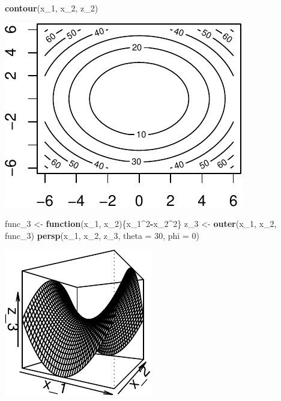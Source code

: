 \documentclass[11pt,]{article}
\newenvironment{Shaded}{\begin{snugshade}}{\end{snugshade}}
\newcommand{\KeywordTok}[1]{\textcolor[rgb]{0.13,0.29,0.53}{\textbf{#1}}}
\newcommand{\DataTypeTok}[1]{\textcolor[rgb]{0.13,0.29,0.53}{#1}}
\newcommand{\DecValTok}[1]{\textcolor[rgb]{0.00,0.00,0.81}{#1}}
\newcommand{\StringTok}[1]{\textcolor[rgb]{0.31,0.60,0.02}{#1}}
\newcommand{\ControlFlowTok}[1]{\textcolor[rgb]{0.13,0.29,0.53}{\textbf{#1}}}
\newcommand{\OperatorTok}[1]{\textcolor[rgb]{0.81,0.36,0.00}{\textbf{#1}}}
\newcommand{\NormalTok}[1]{#1}
\begin{document}
\begin{Shaded}
\begin{Highlighting}[]
\KeywordTok{contour}\NormalTok{(x_}\DecValTok{1}\NormalTok{, x_}\DecValTok{2}\NormalTok{, z_}\DecValTok{2}\NormalTok{)}
\end{Highlighting}
\end{Shaded}

\begin{center}\includegraphics{Optimization_2_files/figure-latex/level_sets-4} \end{center}

\begin{Shaded}
\begin{Highlighting}[]
\NormalTok{func_}\DecValTok{3}\NormalTok{ <-}\StringTok{ }\ControlFlowTok{function}\NormalTok{(x_}\DecValTok{1}\NormalTok{, x_}\DecValTok{2}\NormalTok{)\{x_}\DecValTok{1}\OperatorTok{^}\DecValTok{2}\OperatorTok{-}\NormalTok{x_}\DecValTok{2}\OperatorTok{^}\DecValTok{2}\NormalTok{\}}
\NormalTok{z_}\DecValTok{3}\NormalTok{ <-}\StringTok{ }\KeywordTok{outer}\NormalTok{(x_}\DecValTok{1}\NormalTok{, x_}\DecValTok{2}\NormalTok{, func_}\DecValTok{3}\NormalTok{)}
\KeywordTok{persp}\NormalTok{(x_}\DecValTok{1}\NormalTok{, x_}\DecValTok{2}\NormalTok{, z_}\DecValTok{3}\NormalTok{, }\DataTypeTok{theta =} \DecValTok{30}\NormalTok{, }\DataTypeTok{phi =} \DecValTok{0}\NormalTok{)}
\end{Highlighting}
\end{Shaded}

\begin{center}\includegraphics{Optimization_2_files/figure-latex/level_sets-5} \end{center}
\end{document}
